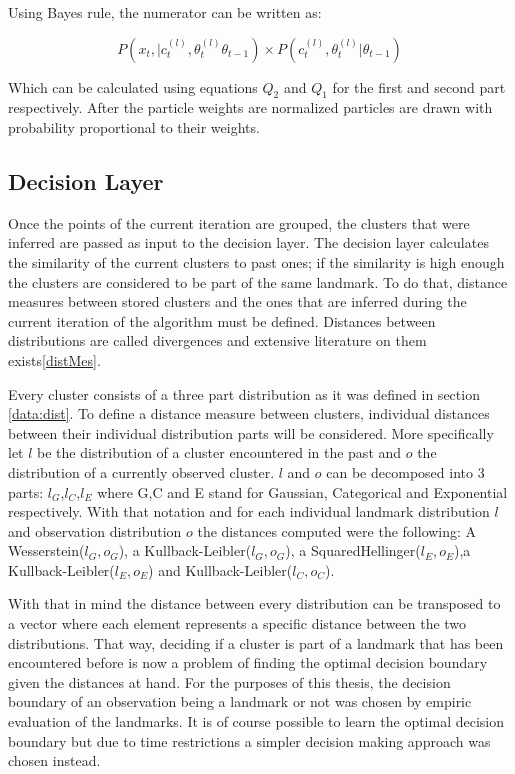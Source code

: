 \documentclass[twoside,hidelinks]{article}
\begin{document}
Using Bayes rule, the numerator can be written as:

\begin{equation}
	P(x_t , | c_t^{(l)} , \theta_t^{(l)} \theta_{t-1} ) \times P(c_t^{(l)} , \theta_t^{(l)}|  \theta_{t-1} )
\end{equation}

Which can be calculated using equations $Q_2$ and $Q_1$ for the first and second part respectively. After the particle weights are normalized particles are drawn with probability proportional to their weights.

\subsection{Decision Layer}

Once the points of the current iteration are grouped, the clusters that were inferred are passed as input to the decision layer. The decision layer calculates the similarity of the current clusters to past ones; if the similarity is high enough the clusters are considered to be part of the same landmark. To do that, distance measures between stored clusters and the ones that are inferred during the current iteration of the algorithm must be defined. Distances between distributions are called divergences and extensive literature on them exists\ref{distMes}.

Every cluster consists of a three part distribution as it was defined in section \ref{data:dist}. To define a distance measure between clusters, individual distances between their individual distribution parts will be considered. More specifically let $l$ be the distribution of a cluster encountered in the past and $o$ the distribution of a currently observed cluster. $l$ and $o$ can be decomposed into 3 parts: $l_G$,$l_C$,$l_E$ where G,C and E stand for Gaussian, Categorical and Exponential respectively. With that notation and for each individual landmark distribution $l$ and observation distribution $o$ the distances computed were the following: A Wesserstein($l_G,o_G$), a Kullback-Leibler($l_G,o_G$), a SquaredHellinger($l_E,o_E$),a Kullback-Leibler($l_E,o_E$) and  Kullback-Leibler($l_C,o_C$).

With that in mind the distance between every distribution can be transposed to a vector where each element represents a specific distance between the two distributions. That way, deciding if a cluster is part of a landmark that has been encountered before is now a problem of finding the optimal decision boundary given the distances at hand. For the purposes of this thesis, the decision boundary of an observation being a landmark or not was chosen by empiric evaluation of the landmarks. It is of course possible to learn the optimal decision boundary but due to time restrictions a simpler decision making approach was chosen instead.
\end{document}
